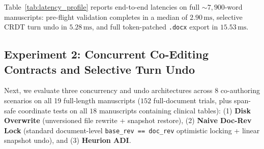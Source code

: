 \documentclass[11pt,a4paper]{article}
\begin{document}
Table~\ref{tab:latency_profile} reports end-to-end latencies on full $\sim\!7{,}900$-word manuscripts: pre-flight validation completes in a median of $2.90\,\text{ms}$, selective CRDT turn undo in $5.28\,\text{ms}$, and full token-patched \texttt{.docx} export in $15.53\,\text{ms}$.

\subsection{Experiment 2: Concurrent Co-Editing Contracts and Selective Turn Undo}
Next, we evaluate three concurrency and undo architectures across 8 co-authoring scenarios on all 19 full-length manuscripts ($152$ full-document trials, plus span-safe coordinate tests on all $18$ manuscripts containing clinical tables): (1) \textbf{Disk Overwrite} (unversioned file rewrite + snapshot restore), (2) \textbf{Naive Doc-Rev Lock} (standard document-level \texttt{base\_rev == doc\_rev} optimistic locking + linear snapshot undo), and (3) \textbf{Heurion ADI}.
\end{document}
